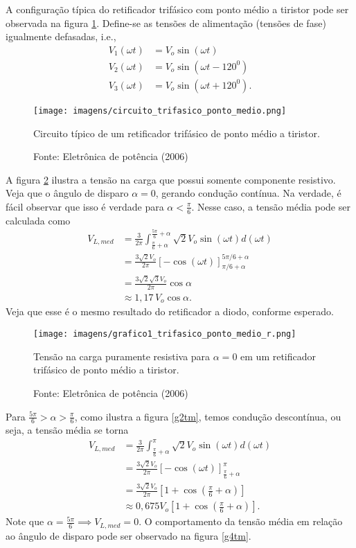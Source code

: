 A configuração típica do retificador trifásico com ponto médio a tiristor pode ser observada na figura \ref{ctpm}. Define-se as tensões de alimentação (tensões de fase) igualmente defasadas, i.e.,
\begin{align*}
 V_{1}(\omega{t}) &= V_{o}\sin(\omega{t}) \\
 V_{2}(\omega{t}) &= V_{o}\sin(\omega{t}-120^0) \\
 V_{3}(\omega{t}) &= V_{o}\sin(\omega{t}+120^0)
.\end{align*}
 
 \begin{figure}[h]
\center
\texttt{[image: imagens/circuito\_trifasico\_ponto\_medio.png]}
\caption{Circuito típico de um retificador trifásico de ponto médio a tiristor.}\label{ctpm}
\caption*{Fonte: Eletrônica de potência (2006)}
\end{figure}
 
 
A figura \ref{g1tm} ilustra a tensão na carga que possui somente componente resistivo. Veja que o ângulo de disparo $\alpha = 0$, gerando condução contínua. Na verdade, é fácil observar que isso é verdade para $\alpha < \frac{\pi}{6}$. Nesse caso, a tensão média pode ser calculada como
\begin{align*}
    V_{L,med} &= \frac{3}{2\pi}\int_{\frac{\pi}{6}+\alpha}^{\frac{5\pi}{6}+\alpha}\sqrt{2}V_{o}\sin(\omega{t})d(\omega{t}) \\
&= \frac{3\sqrt{2}V_{o}}{2\pi}[-\cos(\omega{t})]_{\pi/6+\alpha}^{5\pi/6+\alpha} \\
&= \frac{3\sqrt{2}\sqrt{3}V_{o}}{2\pi}\cos\alpha \\
&\approx 1,17\,V_{o}\cos\alpha
.\end{align*}
Veja que esse é o mesmo resultado do retificador a diodo, conforme esperado.

\begin{figure}[h]
\center
\texttt{[image: imagens/grafico1\_trifasico\_ponto\_medio\_r.png]}
\caption{Tensão na carga puramente resistiva para $\alpha = 0$ em um retificador trifásico de ponto médio a tiristor.}\label{g1tm} 
\caption*{Fonte: Eletrônica de potência (2006)}
\end{figure}

Para $\frac{5\pi}{6} > \alpha > \frac{\pi}{6}$, como ilustra a figura \ref{g2tm}, temos condução descontínua, ou seja, a tensão média se torna
\begin{align*}
    V_{L,med} &= \frac{3}{2\pi}\int_{\frac{\pi}{6}+\alpha}^{\pi}\sqrt{2}V_{o}\sin(\omega{t})d(\omega{t}) \\
&= \frac{3\sqrt{2}V_{o}}{2\pi}\left[-\cos\left(\omega{t}\right)\right]_{\frac{\pi}{6}+\alpha}^{\pi} \\
&= \frac{3\sqrt{2}V_{o}}{2\pi}\left[  1+\cos\left(  \frac{\pi}{6}+\alpha\right) \right]  \\
&\approx 0,675 V_{o}\left[  1+\cos\left(  \frac{\pi}{6}+\alpha \right) \right] 
.\end{align*}
Note que $\alpha = \frac{5\pi}{6} \implies V_{L,med} = 0$. O comportamento da tensão média em relação ao ângulo de disparo pode ser observado na figura \ref{g4tm}.

